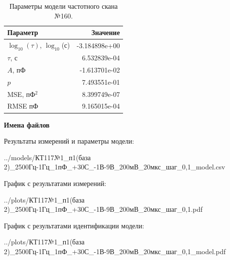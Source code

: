\begin{table}[!ht]
    \centering
    \caption{Параметры модели частотного скана №160.}
    \begin{tabular}{|l|r|}
        \hline
        Параметр                                       & Значение                  \\ \hline
        $\log_{10}(\tau)$, $\log_{10}$(с)              & -3.184898e+00             \\ \hline
        $\tau$, с                                      & 6.532839e-04              \\ \hline
        $A$, пФ                                        & -1.613701e-02             \\ \hline
        $p$                                            & 7.493551e-01              \\ \hline
        MSE, пФ$^2$                                    & 8.399749e-07              \\ \hline
        RMSE пФ                                        & 9.165015e-04              \\ \hline
    \end{tabular}
    \label{table:frequency_scan_model_160}
\end{table}

\textbf{Имена файлов}

Результаты измерений и параметры модели:

\scriptsize../models/КТ117№1\_п1(база 2)\_2500Гц-1Гц\_1пФ\_+30С\_-1В-9В\_200мВ\_20мкс\_шаг\_0,1\_model.csv
\normalsize

График с результатами измерений:

\scriptsize../plots/КТ117№1\_п1(база 2)\_2500Гц-1Гц\_1пФ\_+30С\_-1В-9В\_200мВ\_20мкс\_шаг\_0,1.pdf
\normalsize

График с результатами идентификации модели:

\scriptsize../plots/КТ117№1\_п1(база 2)\_2500Гц-1Гц\_1пФ\_+30С\_-1В-9В\_200мВ\_20мкс\_шаг\_0,1\_model.pdf
\normalsize

